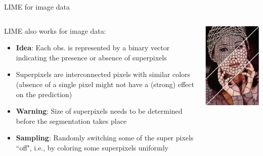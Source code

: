 \documentclass[11pt,compress,t,notes=noshow, aspectratio=169, xcolor=table]{beamer}
\begin{document}
\begin{frame}[c]{LIME for image data}
	\begin{columns}[totalwidth=\textwidth]
		\begin{column}{0.67\textwidth}
			LIME also works for image data:  
			\begin{itemize}
				\item \textbf{Idea}: Each obs. is represented by a binary vector indicating the presence or absence of superpixels 
				\item Superpixels are interconnected pixels with similar colors (absence of a single pixel might not have a (strong) effect on the prediction)
				\item \textbf{Warning}: Size of superpixels needs to be determined before the segmentation takes place
				\item \textbf{Sampling}: Randomly switching some of the super pixels ``off", i.e., by coloring some superpixels uniformly
			\end{itemize}		
		\end{column}
		\begin{column}{0.26\textwidth}  
			\begin{center}
				\includegraphics[width=1\textwidth]{figure/superpixel_woman}

\end{center}
\end{column}
\end{columns}
\end{frame}
\end{document}
